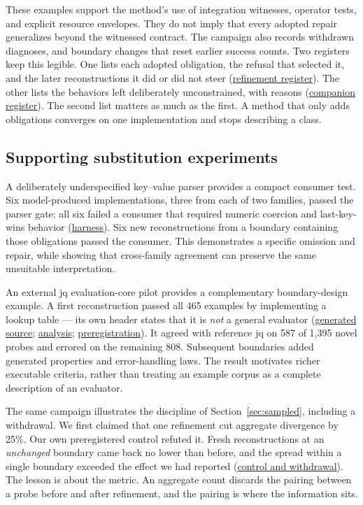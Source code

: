 \documentclass[10pt,twocolumn,letterpaper]{article}
\newcommand{\artifact}[2]{\href{https://github.com/rz4/reticuli/blob/5318acaac34ef99eeba9ff064a995a6313cc70ec/#1}{#2}}
\begin{document}
These examples support the method's use of integration witnesses, operator tests, and explicit resource envelopes. They do not imply that every adopted repair generalizes beyond the witnessed contract. The campaign also records withdrawn diagnoses, and boundary changes that reset earlier success counts. Two registers keep this legible. One lists each adopted obligation, the refusal that selected it, and the later reconstructions it did or did not steer (\artifact{research/metrics/genome-map.md}{refinement register}). The other lists the behaviors left deliberately unconstrained, with reasons (\artifact{research/metrics/freedom-register.md}{companion register}). The second list matters as much as the first. A method that only adds obligations converges on one implementation and stops describing a class.

\subsection{Supporting substitution experiments}
A deliberately underspecified key--value parser provides a compact consumer test. Six model-produced implementations, three from each of two families, passed the parser gate; all six failed a consumer that required numeric coercion and last-key-wins behavior (\artifact{research/harness/substitution}{harness}). Six new reconstructions from a boundary containing those obligations passed the consumer. This demonstrates a specific omission and repair, while showing that cross-family agreement can preserve the same unsuitable interpretation.

An external jq evaluation-core pilot provides a complementary boundary-design example. A first reconstruction passed all 465 examples by implementing a lookup table --- its own header states that it is \emph{not} a general evaluator (\artifact{research/external/jq/evidence/sample1-the-lookup-table.py}{generated source}; \artifact{research/external/jq/generation-1.md}{analysis}; \artifact{research/external/jq/preregistration.md}{preregistration}). It agreed with reference jq on 587 of 1,395 novel probes and errored on the remaining 808. Subsequent boundaries added generated properties and error-handling laws. The result motivates richer executable criteria, rather than treating an example corpus as a complete description of an evaluator.

The same campaign illustrates the discipline of Section~\ref{sec:sampled}, including a withdrawal. We first claimed that one refinement cut aggregate divergence by 25\%. Our own preregistered control refuted it. Fresh reconstructions at an \emph{unchanged} boundary came back no lower than before, and the spread within a single boundary exceeded the effect we had reported (\artifact{research/external/jq/generation-4-control-CORRECTION.md}{control and withdrawal}). The lesson is about the metric. An aggregate count discards the pairing between a probe before and after refinement, and the pairing is where the information sits.
\end{document}

